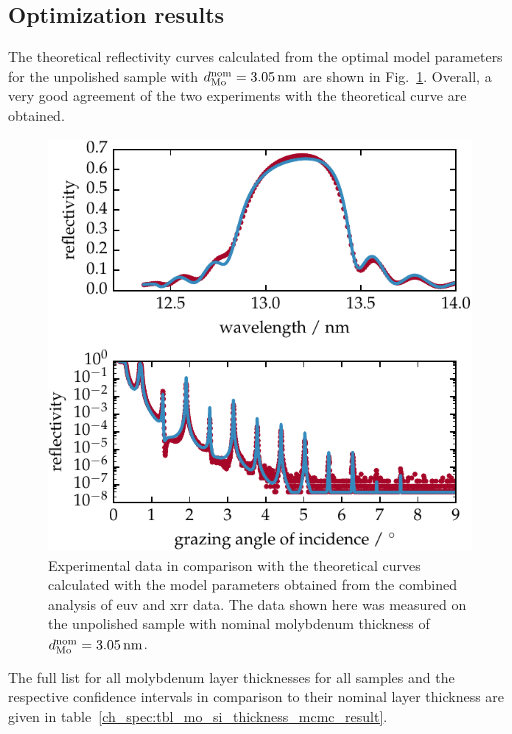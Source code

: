 \subsection{Optimization results}
The theoretical reflectivity curves calculated from the optimal model parameters for the unpolished sample with $d_\text{Mo}^\text{nom} = \nm{3.05}$ are shown in Fig.~\ref{ch_spec:fig_EUV_XRR_combined}. Overall, a very good agreement of the two experiments with the theoretical curve are obtained.
\begin{figure}[htbp]
\centering
\includegraphics{img/PS5657}
\caption{Experimental data in comparison with the theoretical curves calculated with the model parameters obtained from the combined analysis of \gls{euv} and \gls{xrr} data. The data shown here was measured on the unpolished sample with nominal molybdenum thickness of $d_\text{Mo}^\text{nom} = \nm{3.05}$.}
\label{ch_spec:fig_EUV_XRR_combined}
\end{figure}
The full list for all molybdenum layer thicknesses for all samples and the respective confidence intervals in comparison to their nominal layer thickness are given in table~\ref{ch_spec:tbl_mo_si_thickness_mcmc_result}.
